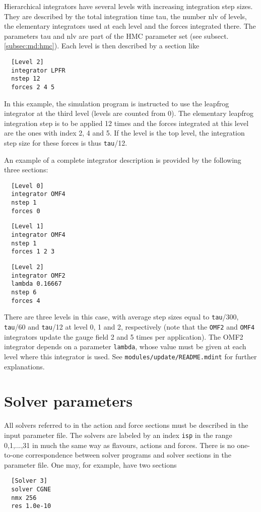 \documentclass[11pt,fleqn]{article}
\begin{document}
Hierarchical integrators have several levels with increasing integration step
sizes. They are described by the total integration time tau, the number nlv of
levels, the elementary integrators used at each level and the forces integrated
there. The parameters tau and nlv are part of the HMC parameter set (see
subsect. \ref{subsec:md:hmc}). Each level is then described by a section like
%
\begin{verbatim}
  [Level 2]
  integrator LPFR
  nstep 12
  forces 2 4 5
\end{verbatim}
%
In this example, the simulation program is instructed to use the leapfrog
integrator at the third level (levels are counted from 0). The elementary
leapfrog integration step is to be applied 12 times and the forces integrated at
this level are the ones with index 2, 4 and 5. If the level is the top level,
the integration step size for these forces is thus \texttt{tau}/12.

An example of a complete integrator description is provided by the following
three sections:
%
\begin{verbatim}
  [Level 0]
  integrator OMF4
  nstep 1
  forces 0
\end{verbatim}

\begin{verbatim}
  [Level 1]
  integrator OMF4
  nstep 1
  forces 1 2 3
\end{verbatim}

\begin{verbatim}
  [Level 2]
  integrator OMF2
  lambda 0.16667
  nstep 6
  forces 4
\end{verbatim}
%
There are three levels in this case, with average step sizes equal to
\texttt{tau}/300, \texttt{tau}/60 and \texttt{tau}/12 at level 0, 1 and 2,
respectively (note that the \texttt{OMF2} and \texttt{OMF4} integrators update
the gauge field 2 and 5 times per application). The OMF2 integrator depends on a
parameter \texttt{lambda}, whose value must be given at each level where this
integrator is used. See \texttt{modules/update/README.mdint} for further
explanations.



\section{Solver parameters}
\label{sec:solvers}


All solvers referred to in the action and force sections must be described in
the input parameter file. The solvers are labeled by an index \texttt{isp} in
the range 0,1,...,31 in much the same way as flavours, actions and forces. There
is no one-to-one correspondence between solver programs and solver sections in
the parameter file. One may, for example, have two sections
%
\begin{verbatim}
  [Solver 3]
  solver CGNE
  nmx 256
  res 1.0e-10
\end{verbatim}
\end{document}

